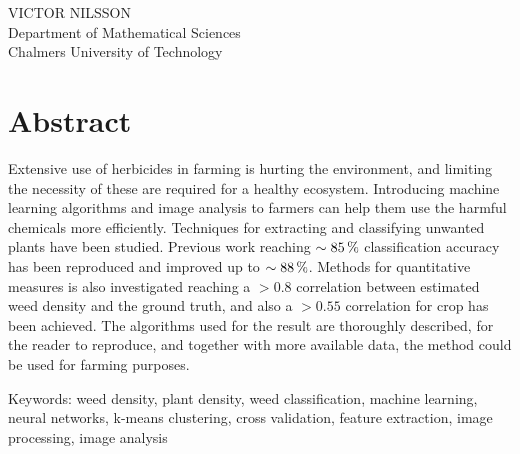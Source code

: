 \titlename\\
\subtitlename\\
VICTOR NILSSON\\
Department of Mathematical Sciences\\
Chalmers University of Technology \setlength{\parskip}{0.5cm}


\thispagestyle{plain}			%
\setlength{\parskip}{0pt plus 1.0pt}
\section*{Abstract}

Extensive use of herbicides in farming is hurting the environment, and limiting the necessity of these are required for a healthy ecosystem. Introducing machine learning algorithms and image analysis to farmers can help them use the harmful chemicals more efficiently. Techniques for extracting and classifying unwanted plants have been studied. Previous work reaching $\sim\unit[85]{\%}$ classification accuracy has been reproduced and improved up to $\sim\unit[88]{\%}$. Methods for quantitative measures is also investigated reaching a $>0.8$ correlation between estimated weed density and the ground truth, and also a $>0.55$ correlation for crop has been achieved. The algorithms used for the result are thoroughly described, for the reader to reproduce, and together with more available data, the method could be used for farming purposes.

\vfill
Keywords: weed density, plant density, weed classification, machine learning, neural networks, k-means clustering, cross validation, feature extraction, image processing, image analysis

\newpage				%
\thispagestyle{empty}
\mbox{}
